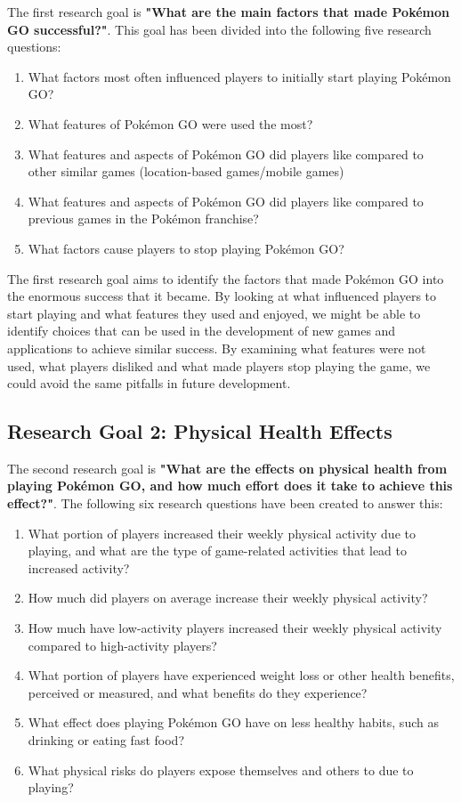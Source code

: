 The first research goal is \textbf{"What are the main factors that made Pokémon GO successful?"}. This goal has been divided into the following five research questions:

\begin{enumerate}
	\item What factors most often influenced players to initially start playing Pokémon GO?
	\item What features of Pokémon GO were used the most?
	\item What features and aspects of Pokémon GO did players like compared to other similar games (location-based games/mobile games)
	\item What features and aspects of Pokémon GO did players like compared to previous games in the Pokémon franchise?
	\item What factors cause players to stop playing Pokémon GO?
\end{enumerate}

The first research goal aims to identify the factors that made Pokémon GO into the enormous success that it became. By looking at what influenced players to start playing and what features they used and enjoyed, we might be able to identify choices that can be used in the development of new games and applications to achieve similar success. By examining what features were not used, what players disliked and what made players stop playing the game, we could avoid the same pitfalls in future development.

\subsection{Research Goal 2: Physical Health Effects}

The second research goal is \textbf{"What are the effects on physical health from playing Pokémon GO, and how much effort does it take to achieve this effect?"}. The following six research questions have been created to answer this:

\begin{enumerate}
	\item What portion of players increased their weekly physical activity due to playing, and what are the type of game-related activities that lead to increased activity?
	\item How much did players on average increase their weekly physical activity?
	\item How much have low-activity players increased their weekly physical activity compared to high-activity players?
	\item What portion of players have experienced weight loss or other health benefits, perceived or measured, and what benefits do they experience?
	\item What effect does playing Pokémon GO have on less healthy  habits, such as drinking or eating fast food?
	\item What physical risks do players expose themselves and others to due to playing?
\end{enumerate}

